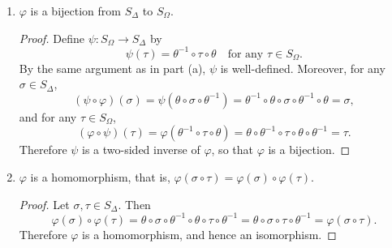 \begin{enumerate}
\begin{proof}
    Now let $y\in\Omega$ be arbitrary. Then we may take
    \begin{equation*}
      x = \varphi(\sigma^{-1})(y)
      = (\theta\circ\sigma^{-1}\circ\theta^{-1})(y)
    \end{equation*}
    so that $\varphi(\sigma)(x) = y$. This shows that
    $\varphi(\sigma)$ is a surjection. Hence $\varphi(\sigma)$ is a
    bijection from $\Omega$ to itself, that is, $\varphi(\sigma)$ is a
    permutation of $\Omega$.
  \end{proof}
\item $\varphi$ is a bijection from $S_\Delta$ to $S_\Omega$.
  \begin{proof}
    Define $\psi\colon S_\Omega\to S_\Delta$ by
    \begin{equation*}
      \psi(\tau) = \theta^{-1}\circ\tau\circ\theta
      \quad\text{for any $\tau\in S_\Omega$}.
    \end{equation*}
    By the same argument as in part (a), $\psi$ is
    well-defined. Moreover, for any $\sigma\in S_\Delta$,
    \begin{equation*}
      (\psi\circ\varphi)(\sigma) = \psi(\theta\circ\sigma\circ\theta^{-1})
      = \theta^{-1}\circ\theta\circ\sigma\circ\theta^{-1}\circ\theta
      = \sigma,
    \end{equation*}
    and for any $\tau\in S_\Omega$,
    \begin{equation*}
      (\varphi\circ\psi)(\tau) = \varphi(\theta^{-1}\circ\tau\circ\theta)
      = \theta\circ\theta^{-1}\circ\tau\circ\theta\circ\theta^{-1}
      = \tau.
    \end{equation*}
    Therefore $\psi$ is a two-sided inverse of $\varphi$, so that
    $\varphi$ is a bijection.
  \end{proof}
\item $\varphi$ is a homomorphism, that is,
  $\varphi(\sigma\circ\tau) = \varphi(\sigma)\circ\varphi(\tau)$.
  \begin{proof}
    Let $\sigma,\tau\in S_\Delta$. Then
    \begin{equation*}
      \varphi(\sigma)\circ\varphi(\tau)
      = \theta\circ\sigma\circ\theta^{-1}\circ\theta\circ\tau\circ\theta^{-1}
      = \theta\circ\sigma\circ\tau\circ\theta^{-1}
      = \varphi(\sigma\circ\tau).
    \end{equation*}
    Therefore $\varphi$ is a homomorphism, and hence an isomorphism.
  \end{proof}
\end{enumerate}

